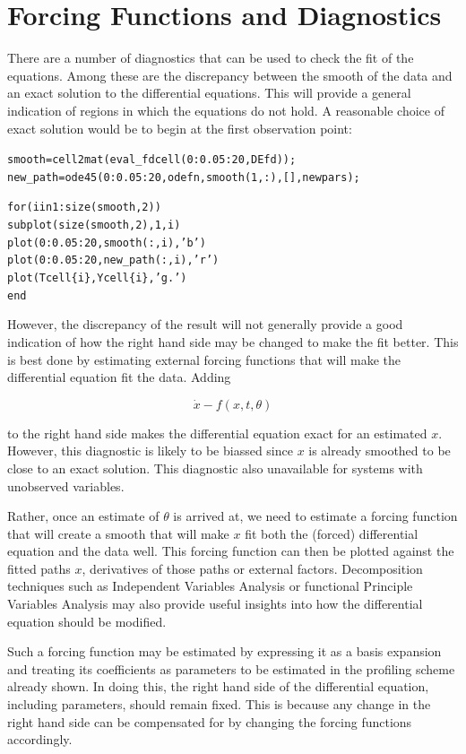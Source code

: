 \documentclass{article}
\newcommand{\nt}    {\noindent}
\begin{document}
\section{Forcing Functions and Diagnostics}

There are a number of diagnostics that can be used to check
the fit of the equations. Among these are the discrepancy
between the smooth of the data and an exact solution to the
differential equations. This will provide a general
indication of regions in which the equations do not hold. A
reasonable choice of exact solution would be to begin at
the first observation point:

\begin{alltt}
   smooth = cell2mat(eval_fdcell(0:0.05:20,DEfd));
   new_path = ode45(0:0.05:20,odefn,smooth(1,:),[],newpars);

   for(i in 1:size(smooth,2))
      subplot(size(smooth,2),1,i)
      plot(0:0.05:20,smooth(:,i),'b')
      plot(0:0.05:20,new_path(:,i),'r')
      plot(Tcell\{i\},Ycell\{i\},'g.')
   end
\end{alltt}

However, the discrepancy of the result will not generally
provide a good indication of how the right hand side may be
changed to make the fit better. This is best done by
estimating external forcing functions that will make the
differential equation fit the data. Adding

\[ \dot{x} - f(x,t,\theta) \]

\nt to the right hand side makes the differential equation exact for an estimated $x$. However,
this diagnostic is likely to be biassed since $x$ is already smoothed to be close to an exact
solution. This diagnostic also unavailable for systems with unobserved variables.

Rather, once an estimate of $\theta$ is arrived at, we need to estimate a forcing function that
will create a smooth that will make $x$ fit both the (forced) differential equation and the data
well. This forcing function can then be plotted against the fitted paths $x$, derivatives of those
paths or external factors. Decomposition techniques such as Independent Variables Analysis or
functional Principle Variables Analysis may also provide useful insights into how the differential
equation should be modified.

Such a forcing function may be estimated by expressing it as a basis
expansion and treating its coefficients as parameters to be estimated
in the profiling scheme already shown. In doing this, the right hand
side of the differential equation, including parameters, should remain
fixed. This is because any change in the right hand side can be
compensated for by changing the forcing functions accordingly.
\end{document}
